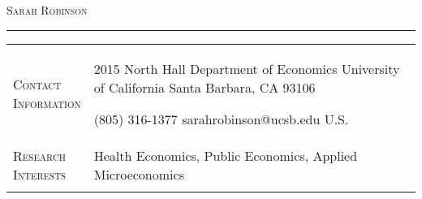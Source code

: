 \documentclass[11pt]{article}
\begin{document}
\thispagestyle{firstpage}

\begin{center}

{\Huge\textsc{Sarah Robinson}} \\[5pt]



\end{center}

\vspace{-6pt}

\noindent\rule{\textwidth}{1pt}

\vspace{6pt}

\begin{tabularx}{\textwidth}{@{}Y Z@{}}
	
	
	\textsc{Contact \newline Information} & 
	\begin{minipage}[t]{0.35\textwidth}
		2015 North Hall \newline
		Department of Economics \newline
		University of California \newline
		Santa Barbara, CA 93106
	\end{minipage}\begin{minipage}[t]{0.4\textwidth}
	 (805) 316-1377 \newline
	 sarahrobinson@ucsb.edu \newline
	 \href{https://www.s-robinson.com}{\color{blue}{www.s-robinson.com}} \newline
	 U.S.
\end{minipage}
	\newline  \\ \addlinespace[15pt] 
	
	\textsc{Research \newline Interests} & 
	Health Economics, Public Economics, Applied Microeconomics
	 \\ \addlinespace[15pt] 
	

\end{tabularx}
\end{document}
